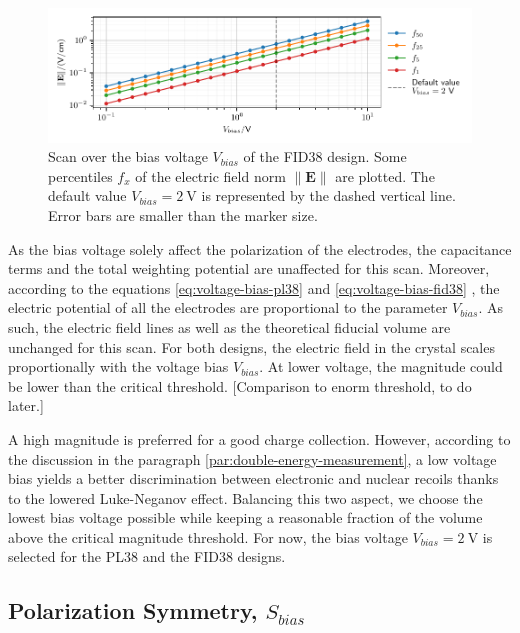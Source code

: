 \begin{figure}
\centering
\includegraphics[scale=1]{Figures/ElectrodesScan/capacitance_fiducial_V_bias.pdf}
\caption{Scan over the bias voltage $V_{bias}$ of the FID38 design. Some percentiles $f_x$ of the electric field norm $\| \mathbf{E} \|$ are plotted. The default value $V_{bias}=\SI{2}{\volt}$ is represented by the dashed vertical line. Error bars are smaller than the marker size.}
\label{fig:capacitance-fiducial-V-bias-pl38}
\end{figure}

As the bias voltage solely affect the polarization of the electrodes, the capacitance terms and the total weighting potential are unaffected for this scan. Moreover, according to the equations \ref{eq:voltage-bias-pl38} and \ref{eq:voltage-bias-fid38} , the electric potential of all the electrodes are proportional to the parameter $V_{bias}$. As such, the electric field lines as well as the theoretical fiducial volume are unchanged for this scan. 
For both designs, the electric field in the crystal scales proportionally with the voltage bias $V_{bias}$. At lower voltage, the magnitude could be lower than the critical threshold.
{\color{red} [Comparison to enorm threshold, to do later.]}

A high magnitude is preferred for a good charge collection. However, according to the discussion in the paragraph \ref{par:double-energy-measurement}, a low voltage bias yields a better discrimination between electronic and nuclear recoils thanks to the lowered Luke-Neganov effect. Balancing this two aspect, we choose the lowest bias voltage possible while keeping a reasonable fraction of the volume above the critical magnitude threshold. For now, the bias voltage $V_{bias} = \SI{2}{\volt}$ is selected for the PL38 and the FID38 designs.


\subsection{Polarization Symmetry, $S_{bias}$}

